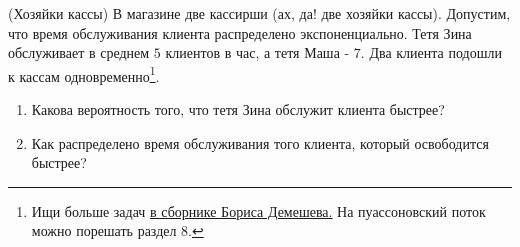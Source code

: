 \documentclass[12pt, a4paper, oneside]{article}
\begin{document}
\begin{problem}{(Хозяйки кассы)}
В магазине две кассирши (ах, да! две хозяйки кассы). Допустим, что время обслуживания клиента распределено экспоненциально. Тетя Зина обслуживает в среднем $5$ клиентов в час, а тетя Маша - $7$. Два клиента подошли к кассам одновременно\footnote{Ищи больше задач \href{https://github.com/bdemeshev/probability_pro}{в сборнике Бориса Демешева.} На пуассоновский поток можно порешать раздел 8.}.

\begin{enumerate}
    \item Какова вероятность того, что тетя Зина обслужит клиента быстрее?
    \item Как распределено время обслуживания того клиента, который освободится быстрее?
\end{enumerate}
\end{problem}
\end{document}

